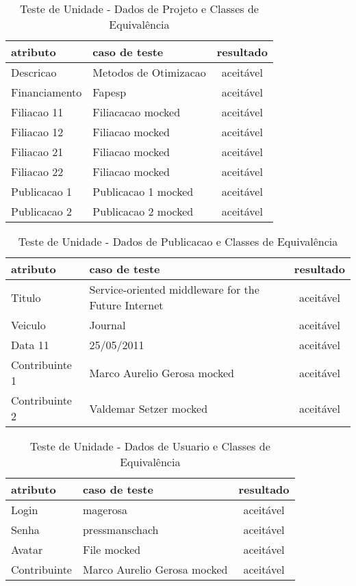 \documentclass[11pt, a4paper]{book}
\begin{document}
\begin{table}
\renewcommand{\arraystretch}{1.3}
 \caption{Teste de Unidade - Dados de Projeto e Classes de Equivalência}
  \label{tab:table6}
\centering
\begin{tabular}[htb]{l|l|c}
\hline\hline
atributo & caso de teste & resultado\\
\hline
Descricao & Metodos de Otimizacao & aceitável \\
Financiamento &  Fapesp & aceitável \\
Filiacao 11& Filiacacao mocked & aceitável \\
Filiacao 12 & Filiacao mocked & aceitável \\
Filiacao 21 & Filiacao mocked & aceitável \\
Filiacao 22& Filiacao mocked & aceitável \\
Publicacao 1 & Publicacao 1  mocked & aceitável \\
Publicacao 2 & Publicacao 2 mocked & aceitável \\
\hline 
\end{tabular}
\end{table}


\begin{table}
\renewcommand{\arraystretch}{1.3}
 \caption{Teste de Unidade - Dados de Publicacao e Classes de Equivalência}
  \label{tab:table6}
\centering
\begin{tabular}[htb]{l|l|c}
\hline\hline
atributo & caso de teste & resultado\\
\hline
Titulo & Service-oriented middleware for the Future Internet & aceitável \\
Veiculo &  Journal & aceitável \\
Data 11&25/05/2011 & aceitável \\
Contribuinte 1 & Marco Aurelio Gerosa mocked & aceitável \\
Contribuinte 2 & Valdemar Setzer mocked& aceitável \\
\hline 
\end{tabular}
\end{table}


\begin{table}
\renewcommand{\arraystretch}{1.3}
 \caption{Teste de Unidade - Dados de Usuario e Classes de Equivalência}
  \label{tab:table6}
\centering
\begin{tabular}[htb]{l|l|c}
\hline\hline
atributo & caso de teste & resultado\\
\hline
Login & magerosa & aceitável \\
Senha &  pressmanschach & aceitável \\
Avatar & File mocked & aceitável \\
Contribuinte & Marco Aurelio Gerosa mocked & aceitável \\
\hline 
\end{tabular}
\end{table}
\end{document}
